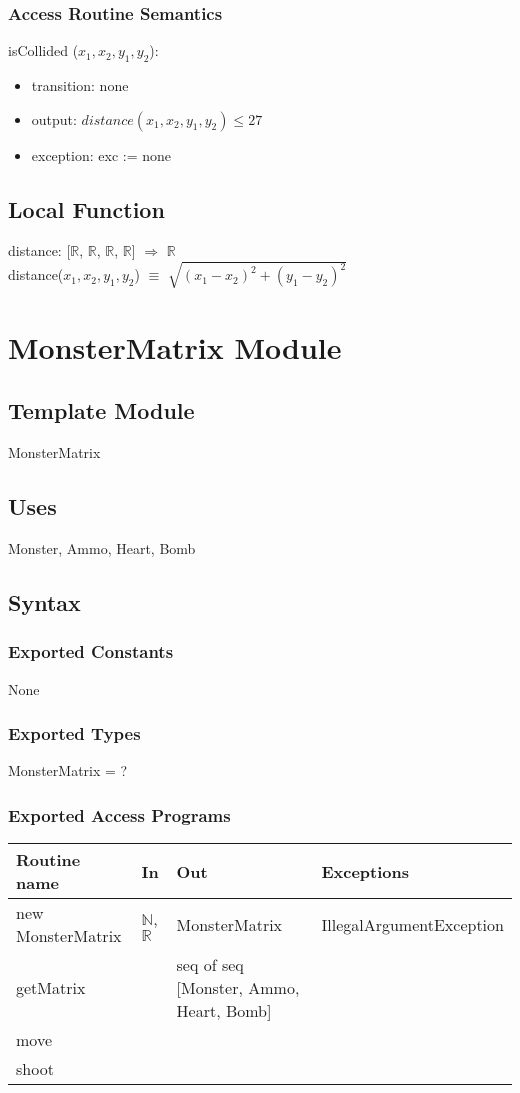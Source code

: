 \documentclass[12pt]{article}
\begin{document}
\subsubsection*{Access Routine Semantics}
\noindent isCollided ($x_1, x_2, y_1, y_2$):
\begin{itemize}
\item transition: none
\item output: $distance(x_1, x_2, y_1, y_2) \leq 27$
\item exception: exc := none
\end{itemize}

\subsection*{Local Function}
distance: [$\mathbb{R}$, $\mathbb{R}$, $\mathbb{R}$, $\mathbb{R}$] $\Rightarrow$ $\mathbb{R}$\\
distance($x_1, x_2, y_1, y_2$) $\equiv$ $\sqrt{(x_1 - x_2)^2 + (y_1 - y_2)^2}$
\newpage

\section{MonsterMatrix Module}

\subsection*{Template Module}
MonsterMatrix

\subsection*{Uses}
Monster, Ammo, Heart, Bomb

\subsection*{Syntax}
\subsubsection*{Exported Constants}
None
\subsubsection*{Exported Types}
MonsterMatrix = ?
\subsubsection*{Exported Access Programs}
\begin{tabular}{| l | l | l | p{5cm} |}
\hline
\textbf{Routine name} & \textbf{In} & \textbf{Out} & \textbf{Exceptions}\\
\hline
new MonsterMatrix & $\mathbb{N}$, $\mathbb{R}$ & MonsterMatrix & IllegalArgumentException\\
\hline
getMatrix && seq of seq [Monster, Ammo, Heart, Bomb] &\\
\hline
move &&&\\
\hline
shoot &&&\\
\hline
\end{tabular}
\end{document}
